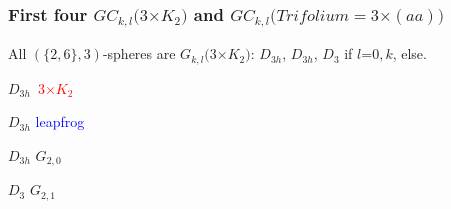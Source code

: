 \documentclass{beamer}
\begin{document}
\begin{frame}\frametitle{First four $GC_{k,l}(3$$\times$$ K_2)$ and $GC_{k,l}(Trifolium =3$$\times$$(aa))$} 




All $(\{2,6\},3)$-spheres are $G_{k,l}(3$$\times$$ K_2)$:  $D_{3h}$, 
$D_{3h}$, $D_3$ if $l$=$0,k$, else.
\begin{center}
\begin{minipage}[b]{25mm}
\centering
{}\par
$D_{3h}\,$ \textcolor{red}{$3$$\times$$K_2$}
\end{minipage}
\begin{minipage}[b]{23mm}
\centering
{}\par
$D_{3h}$ \textcolor{blue}{leapfrog} 
\end{minipage}
\begin{minipage}[b]{18mm}
\centering
{}\par
$D_{3h}$  $G_{2,0}$
\end{minipage} 
\begin{minipage}[b]{28mm}
\centering
{}\par
$D_{3}$ $G_{2,1}$
\end{minipage}
\end{center}







\end{frame}
\end{document}
